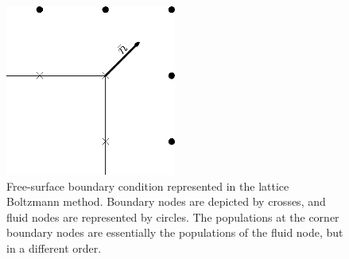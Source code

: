 \documentclass{article}
\begin{document}
\begin{figure}
\includegraphics[width=0.5\textwidth]{Figures/free_surface.eps}
\caption{Free-surface boundary condition represented in the lattice Boltzmann method. 
Boundary nodes are depicted by crosses, and fluid nodes are represented by circles.
The populations at the corner boundary nodes are 
essentially the populations of the fluid node, but in a different order. \label{fig:free:surface}}
\end{figure}


\end{document}
